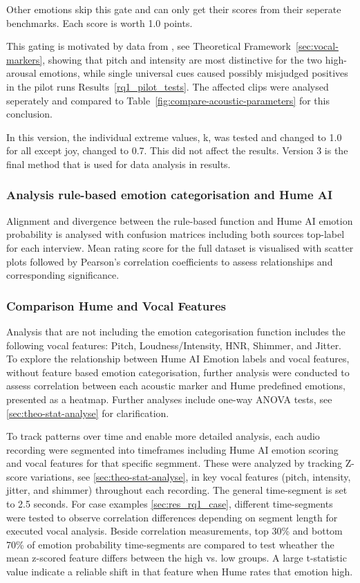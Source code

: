 Other emotions skip this gate and can only get their scores from their seperate benchmarks. Each score is worth 1.0 points. 

This gating is motivated by data from \textcite{Ekberg2023}, see Theoretical Framework~\ref{sec:vocal-markers}, showing that pitch and intensity are most distinctive for 
the two high-arousal emotions, while single universal cues caused possibly misjudged positives in the pilot runs Results~\ref{rq1_pilot_tests}. The affected clips were analysed seperately and compared to Table~\ref{fig:compare-acoustic-parameters} for this conclusion. 

In this version, the individual extreme values, k, was tested and changed to 1.0 for all except joy, changed to 0.7. This did not affect the results. 
Version 3 is the final method that is used for data analysis in results. 

\subsubsection{Analysis rule-based emotion categorisation and Hume AI}
Alignment and divergence between the rule-based function and Hume AI emotion probability is analysed with confusion matrices including both sources top-label for each interview. 
Mean rating score for the full dataset is visualised with scatter plots followed by Pearson's correlation coefficients to assess relationships and corresponding significance. 

\subsubsection{Comparison Hume and Vocal Features}
Analysis that are not including the emotion categorisation function includes the following vocal features: Pitch, Loudness/Intensity, HNR, Shimmer, and Jitter. To explore the relationship between Hume AI Emotion labels and vocal features, without feature based emotion categorisation, further analysis were conducted to assess correlation between each acoustic marker and Hume predefined emotions, presented as a heatmap.
Further analyses include one-way ANOVA tests, see \ref{sec:theo-stat-analyse} for clarification. 

To track patterns over time and enable more detailed analysis, each audio recording were segmented into timeframes including Hume AI emotion scoring and vocal features for that specific segmment. These were analyzed by tracking Z-score variations, see \ref{sec:theo-stat-analyse}, in key vocal features (pitch, intensity, jitter, and shimmer) throughout each recording.
The general time-segment is set to 2.5 seconds. For case examples \ref{sec:res_rq1_case}, different time-segments were tested to observe correlation differences depending on segment length for executed vocal analysis. 
Beside correlation measurements, top 30\% and bottom 70\% of emotion probability time-segments are compared to test wheather the mean z-scored feature differs between the high vs. low groups. 
A large t-statistic value indicate a reliable shift in that feature when Hume rates that emotion high.

